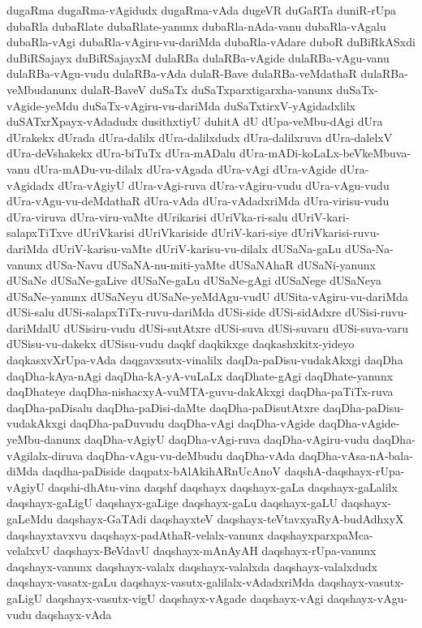 {dugaRma
dugaRma-vAgidudx
dugaRma-vAda
dugeVR
duGaRTa
duniR-rUpa
dubaRla
dubaRlate
dubaRlate-yanunx
dubaRla-nAda-vanu
dubaRla-vAgalu
dubaRla-vAgi
dubaRla-vAgiru-vu-dariMda
dubaRla-vAdare
duboR
duBiRkASxdi
duBiRSajayx
duBiRSajayxM
dulaRBa
dulaRBa-vAgide
dulaRBa-vAgu-vanu
dulaRBa-vAgu-vudu
dulaRBa-vAda
dulaR-Bave
dulaRBa-veMdathaR
dulaRBa-veMbudanunx
dulaR-BaveV
duSaTx
duSaTxparxtigarxha-vanunx
duSaTx-vAgide-yeMdu
duSaTx-vAgiru-vu-dariMda
duSaTxtirxV-yAgidadxlilx
duSATxrXpayx-vAdadudx
dusithxtiyU
duhitA
dU
dUpa-veMbu-dAgi
dUra
dUrakekx
dUrada
dUra-dalilx
dUra-dalilxdudx
dUra-dalilxruva
dUra-dalelxV
dUra-deVshakekx
dUra-biTuTx
dUra-mADalu
dUra-mADi-koLaLx-beVkeMbuva-vanu
dUra-mADu-vu-dilalx
dUra-vAgada
dUra-vAgi
dUra-vAgide
dUra-vAgidadx
dUra-vAgiyU
dUra-vAgi-ruva
dUra-vAgiru-vudu
dUra-vAgu-vudu
dUra-vAgu-vu-deMdathaR
dUra-vAda
dUra-vAdadxriMda
dUra-virisu-vudu
dUra-viruva
dUra-viru-vaMte
dUrikarisi
dUriVka-ri-salu
dUriV-kari-salapxTiTxve
dUriVkarisi
dUriVkariside
dUriV-kari-siye
dUriVkarisi-ruvu-dariMda
dUriV-karisu-vaMte
dUriV-karisu-vu-dilalx
dUSaNa-gaLu
dUSa-Na-vanunx
dUSa-Navu
dUSaNA-nu-miti-yaMte
dUSaNAhaR
dUSaNi-yanunx
dUSaNe
dUSaNe-gaLive
dUSaNe-gaLu
dUSaNe-gAgi
dUSaNege
dUSaNeya
dUSaNe-yanunx
dUSaNeyu
dUSaNe-yeMdAgu-vudU
dUSita-vAgiru-vu-dariMda
dUSi-salu
dUSi-salapxTiTx-ruvu-dariMda
dUSi-side
dUSi-sidAdxre
dUSisi-ruvu-dariMdalU
dUSisiru-vudu
dUSi-sutAtxre
dUSi-suva
dUSi-suvaru
dUSi-suva-varu
dUSisu-vu-dakekx
dUSisu-vudu
daqkf
daqkikxge
daqkashxkitx-yideyo
daqkasxvXrUpa-vAda
daqgavxsutx-vinalilx
daqDa-paDisu-vudakAkxgi
daqDha
daqDha-kAya-nAgi
daqDha-kA-yA-vuLaLx
daqDhate-gAgi
daqDhate-yanunx
daqDhateye
daqDha-nishacxyA-vuMTA-guvu-dakAkxgi
daqDha-paTiTx-ruva
daqDha-paDisalu
daqDha-paDisi-daMte
daqDha-paDisutAtxre
daqDha-paDisu-vudakAkxgi
daqDha-paDuvudu
daqDha-vAgi
daqDha-vAgide
daqDha-vAgide-yeMbu-danunx
daqDha-vAgiyU
daqDha-vAgi-ruva
daqDha-vAgiru-vudu
daqDha-vAgilalx-diruva
daqDha-vAgu-vu-deMbudu
daqDha-vAda
daqDha-vAsa-nA-bala-diMda
daqdha-paDiside
daqpatx-bAlAkihARnUcAnoV
daqshA-daqshayx-rUpa-vAgiyU
daqshi-dhAtu-vina
daqshf
daqshayx
daqshayx-gaLa
daqshayx-gaLalilx
daqshayx-gaLigU
daqshayx-gaLige
daqshayx-gaLu
daqshayx-gaLU
daqshayx-gaLeMdu
daqshayx-GaTAdi
daqshayxteV
daqshayx-teVtavxyaRyA-budAdhxyX
daqshayxtavxvu
daqshayx-padAthaR-velalx-vanunx
daqshayxparxpaMca-velalxvU
daqshayx-BeVdavU
daqshayx-mAnAyAH
daqshayx-rUpa-vanunx
daqshayx-vanunx
daqshayx-valalx
daqshayx-valalxda
daqshayx-valalxdudx
daqshayx-vasatx-gaLu
daqshayx-vasutx-galilalx-vAdadxriMda
daqshayx-vasutx-gaLigU
daqshayx-vasutx-vigU
daqshayx-vAgade
daqshayx-vAgi
daqshayx-vAgu-vudu
daqshayx-vAda
}
